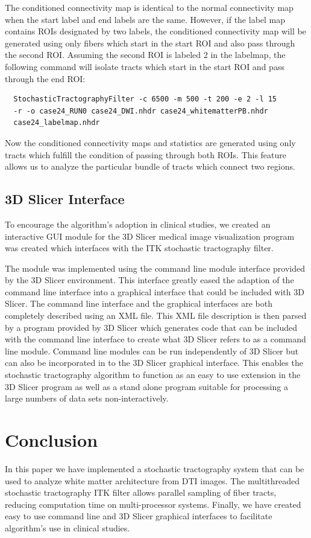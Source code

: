 \documentclass{InsightArticle}
\begin{document}
The conditioned connectivity map is identical to the normal connectivity map when the start label and end labels are the same.  However, if the label map contains ROIs designated by two labels, the conditioned connectivity map will be generated using only fibers which start in the start ROI and also pass through the second ROI.  Assuming the second ROI is labeled $2$ in the labelmap, the following command will isolate tracts which start in the start ROI and pass through the end ROI:
\begin{verbatim}
  StochasticTractographyFilter -c 6500 -m 500 -t 200 -e 2 -l 15
  -r -o case24_RUN0 case24_DWI.nhdr case24_whitematterPB.nhdr
  case24_labelmap.nhdr
\end{verbatim}

Now the conditioned connectivity maps and statistics are generated using only tracts which fulfill the condition of passing through both ROIs.  This feature allows us to analyze the particular bundle of tracts which connect two regions.
 
\subsection{3D Slicer Interface}
To encourage the algorithm's adoption in clinical studies, we created an interactive GUI module for the 3D Slicer medical image visualization program was created which interfaces with the ITK stochastic tractography filter.

The module was implemented using the command line module interface provided by the 3D Slicer environment.  This interface greatly eased the adaption of the command line interface into a graphical interface that could be included with 3D Slicer.  The command line interface and the graphical interfaces are both completely described using an XML file.  This XML file description is then parsed by a program provided by 3D Slicer which generates code that can be included with the command line interface to create what 3D Slicer refers to as a command line module.  Command line modules can be run independently of 3D Slicer but can also be incorporated in to the 3D Slicer graphical interface.  This enables the stochastic tractography algorithm to function as an easy to use extension in the 3D Slicer program as well as a stand alone program suitable for processing a large numbers of data sets non-interactively.

\section{Conclusion}
In this paper we have implemented a stochastic tractography system that can be used to analyze white matter architecture from DTI images.  The multithreaded stochastic tractography ITK filter allows parallel sampling of fiber tracts, reducing computation time on multi-processor systems.  Finally, we have created easy to use command line and 3D Slicer graphical interfaces to facilitate algorithm's use in clinical studies.
%
%



\end{document}
